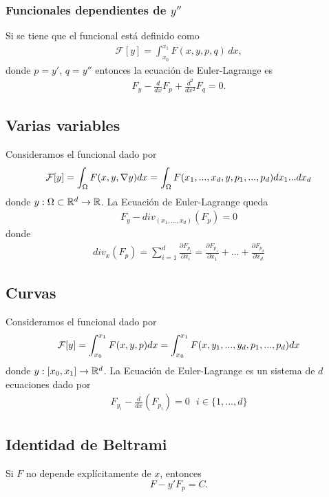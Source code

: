 \documentclass[12pt]{book}
\begin{document}
    \subsubsection{Funcionales dependientes de $y''$}
    Si se tiene que el funcional está definido como 
    \begin{gather*}
        \mathcal F[y]=\int_{x_0}^{x_1}F(x,y,p,q)\,dx,
    \end{gather*}
    donde $p=y'$, $q=y''$ entonces la ecuación de Euler-Lagrange es
    \begin{gather*}
        F_y-\frac{d}{dx}F_{p}+\frac{d^2}{dx^2}F_{q}=0.
    \end{gather*}

    \subsection{Varias variables}
    Consideramos el funcional dado por 
    \begin{gather*}
        \mathcal{F}[y] = \int_\Omega F(x,y,\nabla y) dx = \int_\Omega F(x_1,...,x_d,y,p_1,...,p_d) dx_1...dx_d
    \end{gather*}
    donde $y: \Omega \subset \mathbb{R}^d \to \mathbb{R}$. La Ecuación de Euler-Lagrange queda
    \begin{gather*}
        F_y - div_{(x_1,...,x_d)}(F_p) = 0
    \end{gather*}
    donde
    \begin{gather*}
        div_x(F_p) = \sum_{i=1}^d \frac{\partial F_{p_i}}{\partial x_i} =
        \frac{\partial F_{p_1}}{\partial x_1} + ... + \frac{\partial F_{p_d}}{\partial x_d}
    \end{gather*}

    \subsection{Curvas}
    Consideramos el funcional dado por 
    \begin{gather*}
        \mathcal{F}[y] = \int_{x_0}^{x_1} F(x,y,p) dx = \int_{x_0}^{x_1} F(x, y_1,...,y_d, p_1,...,p_d)dx
    \end{gather*}
    donde $y:[x_0, x_1]\to \mathbb{R}^d$. La Ecuación de Euler-Lagrange es un sistema de $d$ ecuaciones dado por
    \begin{gather*}
        F_{y_i} - \frac{d}{dx}(F_{p_i})=0\ \ \ i\in\{1,...,d\}
    \end{gather*}

    \subsection{Identidad de Beltrami}
    Si $F$ no depende explícitamente de $x$, entonces
    \[
    F-y'F_p=C.
    \]
\end{document}
